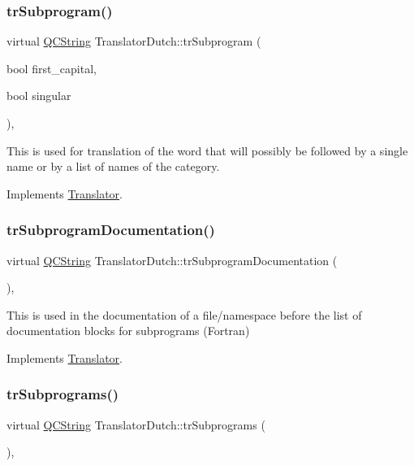\subsubsection{\texorpdfstring{trSubprogram()}{trSubprogram()}}
{\footnotesize\ttfamily virtual \mbox{\hyperlink{class_q_c_string}{Q\+C\+String}} Translator\+Dutch\+::tr\+Subprogram (\begin{DoxyParamCaption}\item[{bool}]{first\+\_\+capital,  }\item[{bool}]{singular }\end{DoxyParamCaption})\hspace{0.3cm}{\ttfamily [inline]}, {\ttfamily [virtual]}}

This is used for translation of the word that will possibly be followed by a single name or by a list of names of the category. 

Implements \mbox{\hyperlink{class_translator}{Translator}}.

\mbox{\label{class_translator_dutch_a0a6b9d26f411dece9f54f6e7677e555e}} 
\subsubsection{\texorpdfstring{trSubprogramDocumentation()}{trSubprogramDocumentation()}}
{\footnotesize\ttfamily virtual \mbox{\hyperlink{class_q_c_string}{Q\+C\+String}} Translator\+Dutch\+::tr\+Subprogram\+Documentation (\begin{DoxyParamCaption}{ }\end{DoxyParamCaption})\hspace{0.3cm}{\ttfamily [inline]}, {\ttfamily [virtual]}}

This is used in the documentation of a file/namespace before the list of documentation blocks for subprograms (Fortran) 

Implements \mbox{\hyperlink{class_translator}{Translator}}.

\mbox{\label{class_translator_dutch_a980d765ac9d746331e68a9aec6cc9c66}} 
\subsubsection{\texorpdfstring{trSubprograms()}{trSubprograms()}}
{\footnotesize\ttfamily virtual \mbox{\hyperlink{class_q_c_string}{Q\+C\+String}} Translator\+Dutch\+::tr\+Subprograms (\begin{DoxyParamCaption}{ }\end{DoxyParamCaption})\hspace{0.3cm}{\ttfamily [inline]}, {\ttfamily [virtual]}}

